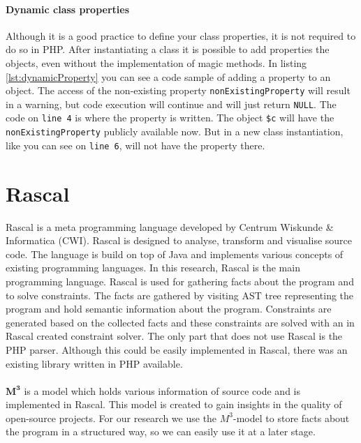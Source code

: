 \documentclass[../main.tex]{subfiles}
\begin{document}
	

    \paragraph{Dynamic class properties}
    Although it is a good practice to define your class properties, it is not required to do so in PHP.
    After instantiating a class it is possible to add properties the objects, even without the implementation of magic methods.
    In listing \ref{lst:dynamicProperty} you can see a code sample of adding a property to an object.
    The access of the non-existing property \texttt{nonExistingProperty} will result in a warning, but code execution will continue and will just return \texttt{NULL}.
    The code on \texttt{line 4} is where the property is written.
    The object \texttt{\$c} will have the \texttt{nonExistingProperty} publicly available now.
    But in a new class instantiation, like you can see on \texttt{line 6}, will not have the property there.
    
    
    
    \section{Rascal}\label{sec:background_rascal}
    \Gls{Rascal}\cite{Kli:09} is a meta programming language developed by Centrum Wiskunde \& Informatica (CWI).
    Rascal is designed to analyse, transform and visualise source code.
    The language is build on top of Java and implements various concepts of existing programming languages.
    In this research, Rascal is the main programming language.
    Rascal is used for gathering facts about the program and to solve constraints.
    The facts are gathered by visiting AST tree representing the program and hold semantic information about the program.
    Constraints are generated based on the collected facts and these constraints are solved with an in Rascal created constraint solver.
    The only part that does not use Rascal is the PHP parser.
    Although this could be easily implemented in Rascal, there was an existing library written in PHP available.

    \paragraph{}
    $\pmb{M^3}$\cite{Ana:13,Bas:15} is a model which holds various information of source code and is implemented in Rascal.
    This model is created to gain insights in the quality of open-source projects.
    For our research we use the $M^3$-model to store facts about the program in a structured way, so we can easily use it at a later stage.
    
\end{document}
